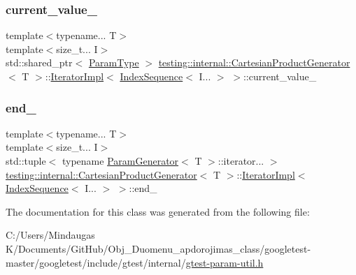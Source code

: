 \subsubsection{\texorpdfstring{current\_value\_}{current\_value\_}}
{\footnotesize\ttfamily template$<$typename... T$>$ \\
template$<$size\+\_\+t... I$>$ \\
std\+::shared\+\_\+ptr$<$ \mbox{\hyperlink{classtesting_1_1internal_1_1_cartesian_product_generator_af27131157a9347f0c82420ca081ee7dd}{Param\+Type}} $>$ \mbox{\hyperlink{classtesting_1_1internal_1_1_cartesian_product_generator}{testing\+::internal\+::\+Cartesian\+Product\+Generator}}$<$ T $>$\+::\mbox{\hyperlink{classtesting_1_1internal_1_1_cartesian_product_generator_1_1_iterator_impl}{Iterator\+Impl}}$<$ \mbox{\hyperlink{structtesting_1_1internal_1_1_index_sequence}{Index\+Sequence}}$<$ I... $>$ $>$\+::current\+\_\+value\+\_\+\hspace{0.3cm}{\ttfamily [private]}}

\mbox{\label{classtesting_1_1internal_1_1_cartesian_product_generator_1_1_iterator_impl_3_01_index_sequence_3_01_i_8_8_8_01_4_01_4_a290ebf375e69b4d7755edd5d840c365a}} 
\subsubsection{\texorpdfstring{end\_}{end\_}}
{\footnotesize\ttfamily template$<$typename... T$>$ \\
template$<$size\+\_\+t... I$>$ \\
std\+::tuple$<$ typename \mbox{\hyperlink{classtesting_1_1internal_1_1_param_generator}{Param\+Generator}}$<$ T $>$\+::iterator... $>$ \mbox{\hyperlink{classtesting_1_1internal_1_1_cartesian_product_generator}{testing\+::internal\+::\+Cartesian\+Product\+Generator}}$<$ T $>$\+::\mbox{\hyperlink{classtesting_1_1internal_1_1_cartesian_product_generator_1_1_iterator_impl}{Iterator\+Impl}}$<$ \mbox{\hyperlink{structtesting_1_1internal_1_1_index_sequence}{Index\+Sequence}}$<$ I... $>$ $>$\+::end\+\_\+\hspace{0.3cm}{\ttfamily [private]}}



The documentation for this class was generated from the following file\+:\begin{DoxyCompactItemize}
\item 
C\+:/\+Users/\+Mindaugas K/\+Documents/\+Git\+Hub/\+Obj\+\_\+\+Duomenu\+\_\+apdorojimas\+\_\+class/googletest-\/master/googletest/include/gtest/internal/\mbox{\hyperlink{googletest-master_2googletest_2include_2gtest_2internal_2gtest-param-util_8h}{gtest-\/param-\/util.\+h}}\end{DoxyCompactItemize}
